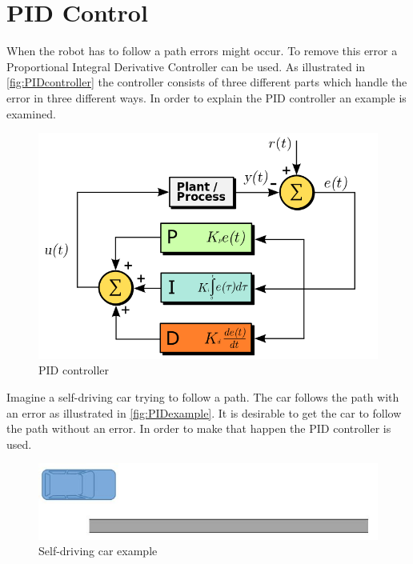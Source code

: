 \section{PID Control} %
\label{sec:pid_control}

When the robot has to follow a path errors might occur. To remove this error a Proportional Integral Derivative Controller can be used. As illustrated in \autoref{fig:PIDcontroller} the controller consists of three different parts which handle the error in three different ways. In order to explain the PID controller an example is examined. \\

\begin{figure}[h]
\centering
\includegraphics[scale=0.35]{images/PIDController}
\caption{PID controller}
\label{fig:PIDcontroller}
\end{figure}

Imagine a self-driving car trying to follow a path. The car follows the path with an error as illustrated in \autoref{fig:PIDexample}. It is desirable to get the car to follow the path without an error. In order to make that happen the PID controller is used.

\begin{figure}[h]
\centering
\includegraphics[scale=0.7]{images/PIDexample}
\caption{Self-driving car example}
\label{fig:PIDexample}
\end{figure}

